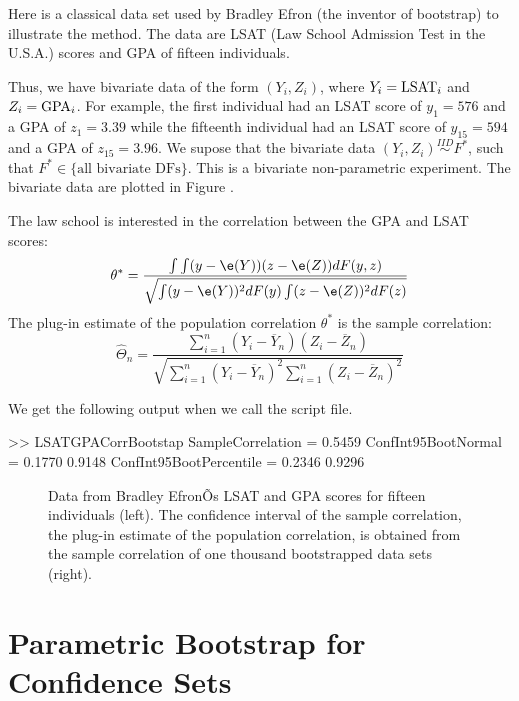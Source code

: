 \begin{labwork}\label{LW:LSATGPACorrBoot}
Here is a classical data set used by Bradley Efron (the inventor of bootstrap) to illustrate the method.  The data are LSAT (Law School Admission Test in the U.S.A.) scores and GPA of fifteen individuals.

Thus, we have bivariate data of the form $(Y_i,Z_i)$, where $Y_i={\rm LSAT}_i$ and $Z_i={\rm GPA}_i$.  For example, the first individual had an LSAT score of  $y_1=576$ and a GPA of $z_1=3.39$ while the fifteenth individual had an LSAT score of $y_{15}=594$ and a GPA of $z_{15}=3.96$.  We supose that the bivariate data $(Y_i,Z_i) \overset{IID}{\sim} F^*$, such that $F^* \in \{ \text{all bivariate DFs} \}$.  This is a bivariate non-parametric experiment.  The bivariate data are plotted in Figure .


The law school is interested in the correlation between the GPA and LSAT scores:
$$
\theta^* = \frac{\int \int (y-\e(Y))(z-\e(Z))dF(y,z)}{\sqrt{\int (y-\e(Y))^2 dF(y) \int (z-\e(Z))^2 dF(z)}}
$$
The plug-in estimate of the population correlation $\theta^*$ is the sample correlation:
$$
\widehat{\Theta}_n = \frac{\sum_{i=1}^n(Y_i-\overline{Y}_n)(Z_i-\overline{Z}_n)}{\sqrt{\sum_{i=1}^n(Y_i-\overline{Y}_n)^2 \sum_{i=1}^n(Z_i-\overline{Z}_n)^2}}
$$ 

We get the following output when we call the script file.
\begin{VrbM}
>> LSATGPACorrBootstap
SampleCorrelation =    0.5459
ConfInt95BootNormal =    0.1770    0.9148
ConfInt95BootPercentile =    0.2346    0.9296
\end{VrbM}

\begin{figure}
\caption{Data from Bradley EfronÕs LSAT and GPA scores for fifteen individuals (left).  The confidence interval of the sample correlation, the plug-in estimate of the population correlation, is obtained from the sample correlation of one thousand bootstrapped data sets (right).\label{F:LSATGPACorrBootstrap}}
\begin{center}
\end{center}
\end{figure}

\end{labwork}

\section{Parametric Bootstrap for Confidence Sets}\label{S:PBootstrap}

